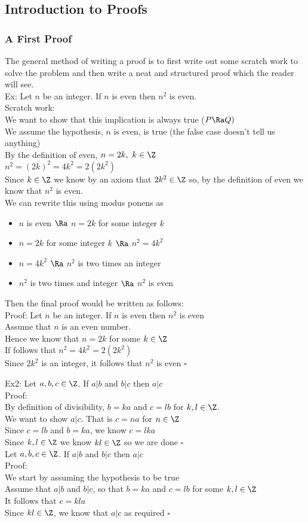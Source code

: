 \subsection{Introduction to Proofs}
\subsubsection{A First Proof}
The general method of writing a proof is to first write out some scratch work to solve the problem and then write a neat and structured proof which the reader will see.\\
Ex: Let $n$ be an integer. If $n$ is even then $n^2$ is even.\\
Scratch work:\\
We want to show that this implication is always true ($P\Ra Q)$\\
We assume the hypothesis, $n$ is even, is true (the false case doesn't tell us anything)\\
By the definition of even, $n=2k,\ k\in\Z$\\
$n^2=(2k)^2=4k^2=2(2k^2)$\\
Since $k\in\Z$ we know by an axiom that $2k^2\in\Z$ so, by the definition of even we know that $n^2$ is even.\\
We can rewrite this using modus ponens as
\begin{itemize}
    \item $n$ is even $\Ra$ $n=2k$ for some integer $k$
    \item $n=2k$ for some integer $k$ $\Ra$ $n^2=4k^2$
    \item $n=4k^2$ $\Ra$ $n^2$ is two times an integer
    \item $n^2$ is two times and integer $\Ra$ $n^2$ is even
\end{itemize}
Then the final proof would be written as follows:\\

Proof:
Let $n$ be an integer. If $n$ is even then $n^2$ is even\\
Assume that $n$ is an even number.\\
Hence we know that $n=2k$ for some $k\in\Z$\\
If follows that $n^2=4k^2=2(2k^2)$\\
Since $2k^2$ is an integer, it follows that $n^2$ is even $\square$

Ex2: Let $a,b,c\in\Z$. If $a|b$ and $b|c$ then $a|c$\\
Proof:\\
By definition of divisibility, $b=ka$ and $c=lb$ for $k,l\in\Z$.\\
We want to show $a|c$. That is $c=na$ for $n\in\Z$\\
Since $c=lb$ and $b=ka$, we know $c=lka$\\
Since $k,l\in\Z$ we know $kl\in\Z$ so we are done $\square$\\

Let $a,b,c\in\Z$. If $a|b$ and $b|c$ then $a|c$\\
Proof:\\
We start by assuming the hypothesis to be true\\
Assume that $a|b$ and $b|c$, so that $b=ka$ and $c=lb$ for some $k,l\in\Z$\\
It follows that $c=kla$\\
Since $kl\in\Z$, we know that $a|c$ as required $\square$